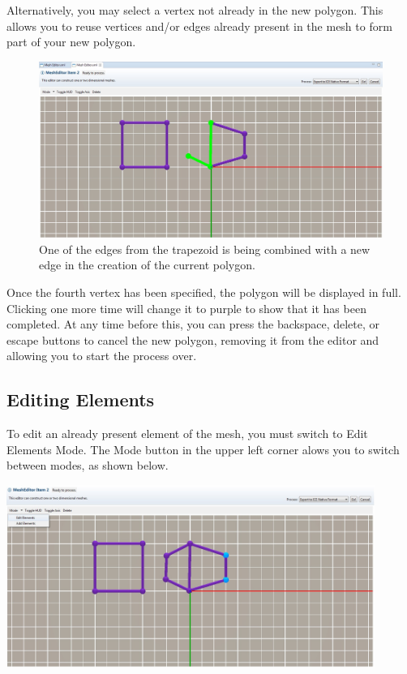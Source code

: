 \documentclass{article}
\begin{document}
Alternatively, you may select a vertex not already in the new polygon. This
allows you to reuse vertices and/or edges already present in the mesh to form
part of your new polygon.

\begin{figure}
\begin{center}
\includegraphics[width=12cm]{images/MeshEditorReuseEdge}
\caption{One of the edges from the trapezoid is being combined with a new edge
in the creation of the current polygon.}
\end{center}
\end{figure}

Once the fourth vertex has been specified, the polygon will be displayed
in full. Clicking one more time will change it to purple to show that it has
been completed. At any time before this, you can press the backspace, delete,
or escape buttons to cancel the new polygon, removing it from the editor and
allowing you to start the process over.

\subsection{Editing Elements}

To edit an already present element of the mesh, you must switch to Edit Elements
Mode. The Mode button in the upper left corner alows you to switch between
modes, as shown below.

\begin{center}
\includegraphics[width=12cm]{images/MeshEditorEditMode}
\end{center}
\end{document}

